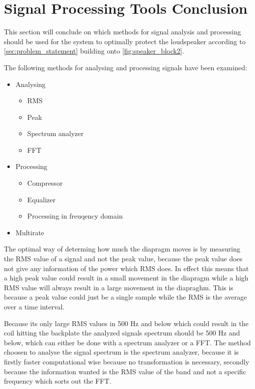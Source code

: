 \section{Signal Processing Tools Conclusion}
This section will conclude on which methods for signal analysis and processing should be used for the system to optimally protect the loudspeaker according to \autoref{sec:problem_statement} building onto \autoref{fig:speaker_block2}.

The following methods for analysing and processing signals have been examined:
\begin{itemize}
\item Analysing
\begin{itemize}
\item RMS
\item Peak
\item Spectrum analyzer
\item FFT
\end{itemize}
\item Processing
\begin{itemize}
\item Compressor
\item Equalizer
\item Processing in freuqency domain
\end{itemize}
\item Multirate
\end{itemize}

The optimal way of determing how much the diapragm moves is by measuring the RMS value of a signal and not the peak value, because the peak value does not give any information of the power which RMS does. In effect this means that a high peak value could result in a small movement in the diapragm while a high RMS value will always result in a large movement in the diapraghm. This is because a peak value could just be a single sample while the RMS is the average over a time interval. 

Because its only large RMS values in 500 Hz and below which could result in the coil hitting the backplate the analyzed signals spectrum should be 500 Hz and below, which can either be done with a spectrum analyzer or a FFT. The method choosen to analyse the signal spectrum is the spectrum analyzer, because it is firstly faster computational wise because no transformation is necessary, secondly because the information wanted is the RMS value of the band and not a specific frequency which sorts out the FFT. %

